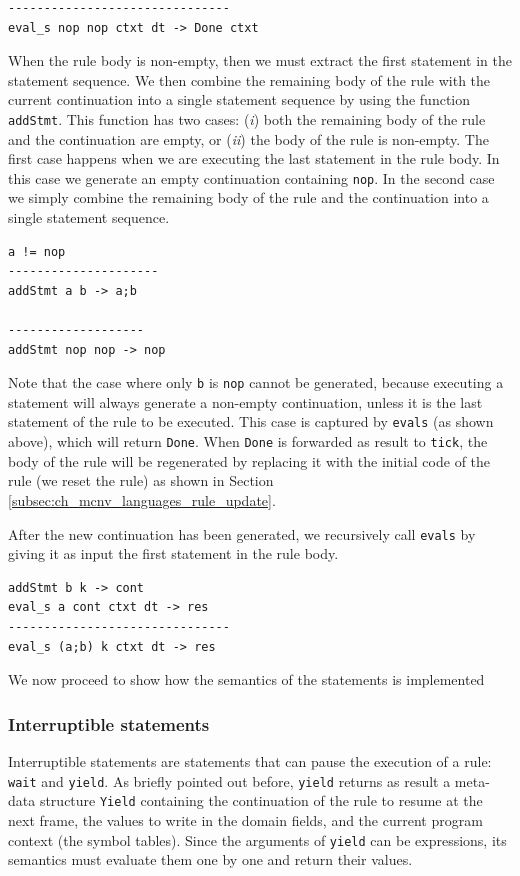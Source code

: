 \begin{lstlisting}
-------------------------------
eval_s nop nop ctxt dt -> Done ctxt
\end{lstlisting}

\noindent
When the rule body is non-empty, then we must extract the first statement in the statement sequence. We then combine the remaining body of the rule with the current continuation into a single statement sequence by using the function \texttt{addStmt}. This function has two cases: (\textit{i}) both the remaining body of the rule and the continuation are empty, or (\textit{ii}) the body of the rule is non-empty. The first case happens when we are executing the last statement in the rule body. In this case we generate an empty continuation containing \texttt{nop}. In the second case we simply combine the remaining body of the rule and the continuation into a single statement sequence.

\begin{lstlisting}
a != nop
---------------------
addStmt a b -> a;b

-------------------
addStmt nop nop -> nop
\end{lstlisting}

\noindent
Note that the case where only \texttt{b} is \texttt{nop} cannot be generated, because executing a statement will always generate a non-empty continuation, unless it is the last statement of the rule to be executed. This case is captured by \texttt{eval\tu s} (as shown above), which will return \texttt{Done}. When \texttt{Done} is forwarded as result to \texttt{tick}, the body of the rule will be regenerated by replacing it with the initial code of the rule (we reset the rule) as shown in Section \ref{subsec:ch_mcnv_languages_rule_update}.

After the new continuation has been generated, we recursively call \texttt{eval\tu s} by giving it as input the first statement in the rule body.

\begin{lstlisting}
addStmt b k -> cont
eval_s a cont ctxt dt -> res
-------------------------------
eval_s (a;b) k ctxt dt -> res
\end{lstlisting}

We now proceed to show how the semantics of the statements is implemented

\subsubsection{Interruptible statements}
Interruptible statements are statements that can pause the execution of a rule: \texttt{wait} and \texttt{yield}. As briefly pointed out before, \texttt{yield} returns as result a meta-data structure \texttt{Yield} containing the continuation of the rule to resume at the next frame, the values to write in the domain fields, and the current program context (the symbol tables). Since the arguments of \texttt{yield} can be expressions, its semantics must evaluate them one by one and return their values.

